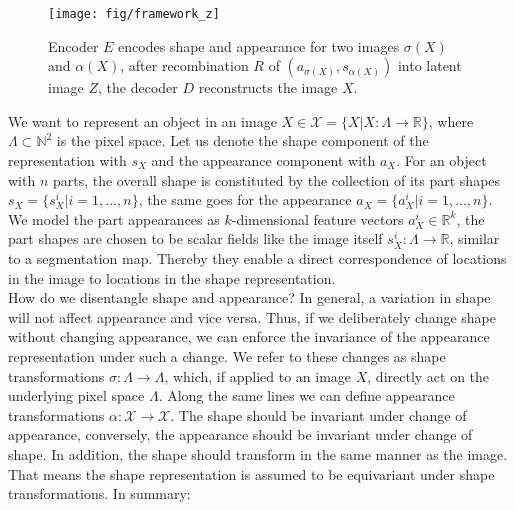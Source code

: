 \begin{figure}[h]
\centering
\texttt{[image: fig/framework\_z]}
\caption{ \small{Encoder $E$ encodes shape and appearance for two images $\sigma(X)$ and $\alpha(X)$, after recombination $R$ of $(a_{\sigma(X)}, s_{\alpha(X)})$ into latent image $Z$, the decoder $D$ reconstructs the image $X$.}}
\label{fig:framework}
\end{figure}
We want to represent an object in an image $X \in \mathcal{X} = \{X| X: \Lambda \rightarrow \mathbb{R} \}$, where $\Lambda \subset \mathbb{N}^2$ is the pixel space. Let us denote the shape component of the representation with $s_X$ and the appearance component with $a_X$. For an object with $n$ parts, the overall shape is constituted by the collection of its part shapes $s_X =  \{s^i_X| i=1, ...,  n\}$, the same goes for the appearance $a_X =  \{a^i_X| i=1, ...,  n\}$. We model the part appearances as $k$-dimensional feature vectors $a^i_X \in \mathbb{R}^k$, the part shapes are chosen to be scalar fields like the image itself $s^i_X: \Lambda \rightarrow \mathbb{R}$, similar to a segmentation map. Thereby they enable a direct correspondence of locations in the image to locations in the shape representation.\\
How do we disentangle shape and appearance? In general, a variation in shape will not affect appearance and vice versa. Thus, if we deliberately change shape without changing appearance, we can enforce the invariance of the appearance representation under such a change. We refer to these changes as shape transformations $\sigma: \Lambda \rightarrow \Lambda$, which, if applied to an image $X$, directly act on the underlying pixel space $\Lambda$. Along the same lines we can define appearance transformations $\alpha: \mathcal{X \rightarrow \mathcal{X}}$.
The shape should be invariant under change of appearance, conversely, the appearance should be invariant under change of shape. In addition, the shape should transform in the same manner as the image. That means the shape representation is assumed to be equivariant under shape transformations. In summary:
